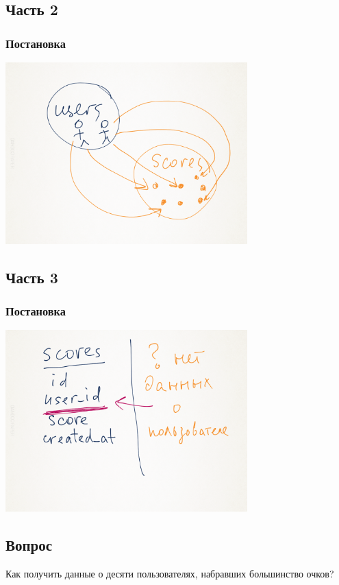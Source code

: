 \documentclass[compress,red]{beamer}
\begin{document}
\subsection{Часть 2}
\begin{frame}[fragile]
  \frametitle{Постановка}
  \centerline{\includegraphics[width=0.7\textwidth]{images/manual2.png}}
\end{frame}

\subsection{Часть 3}
\begin{frame}[fragile]
  \frametitle{Постановка}
  \centerline{\includegraphics[width=0.7\textwidth]{images/manual3.png}}
\end{frame}

\subsection{Вопрос}
\begin{frame}
  \begin{center}
    \Large{Как получить данные о десяти пользователях, набравших большинство очков?}
  \end{center}
\end{frame}
\end{document}
